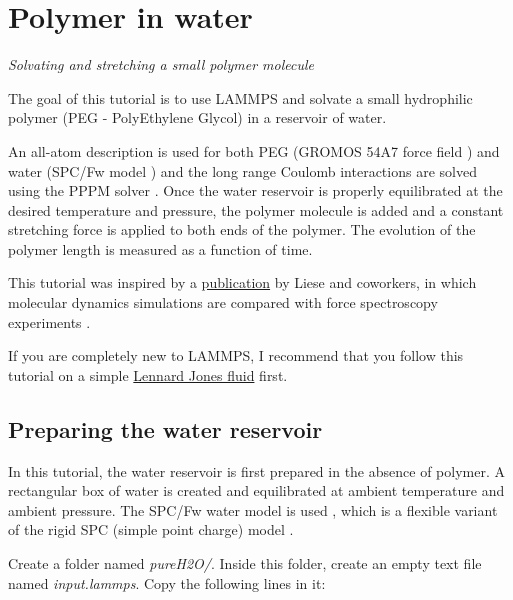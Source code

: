 \chapter{Polymer in water}
\label{all-atoms-label}

\noindent \vspace{-1cm} \noindent \textcolor{graytitle}{\textit{{\Large Solvating and stretching a small polymer molecule}}\vspace{0.5cm} }

\vspace{0.25cm} \noindent The goal of this tutorial is to use LAMMPS and solvate a small
hydrophilic polymer (PEG - PolyEthylene Glycol) in a reservoir of water. 

\vspace{0.25cm} \noindent An all-atom description is used for both PEG (GROMOS 54A7 force
field \cite{schmid2011definition}) and water
(SPC/Fw model \cite{wu2006flexible}) and the long
range Coulomb interactions are solved using the PPPM solver \cite{luty1996calculating}.    
Once the water reservoir is properly
equilibrated at the desired temperature and pressure, the polymer molecule
is added and a constant stretching force is applied to both
ends of the polymer. The evolution of the polymer length
is measured as a function of time.

\vspace{0.25cm} \noindent This tutorial was inspired by a \href{https://doi.org/10.1021/acsnano.6b07071}{publication} by Liese and coworkers, in which
molecular dynamics simulations are
compared with force spectroscopy experiments \cite{liese2017hydration}.

\vspace{0.25cm} \noindent If you are completely new to LAMMPS, I recommend that
you follow this tutorial on a simple \hyperref[lennard-jones-label]{Lennard Jones fluid} first.

\section{Preparing the water reservoir}
\noindent In this tutorial, the water reservoir is first prepared in the absence of
polymer. A rectangular box of water is created and
equilibrated at ambient temperature and ambient pressure.
The SPC/Fw water model is used \cite{wu2006flexible}, which is
a flexible variant of the rigid SPC (simple point charge)
model \cite{berendsen1981interaction}.

\vspace{0.25cm} \noindent Create a folder named \textit{pureH2O/}. Inside this folder, create
an empty text file named \textit{input.lammps}. Copy the following
lines in it:

